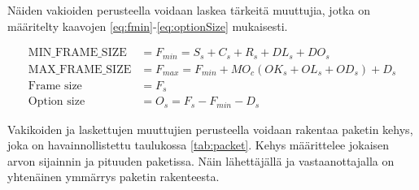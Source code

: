 \documentclass[a4paper,12pt]{article}
\begin{document}
    Näiden vakioiden perusteella voidaan laskea tärkeitä muuttujia, jotka on määritelty kaavojen \ref{eq:fmin}-\ref{eq:optionSize} mukaisesti.

    \begin{align}
        \text{MIN\_FRAME\_SIZE} &= F_{min} = S_s + C_s + R_s + DL_s + DO_s \label{eq:fmin} \\
        \text{MAX\_FRAME\_SIZE} &= F_{max} = F_{min} + MO_c(OK_s + OL_s + OD_s) + D_s \label{eq:fmax} \\
        \text{Frame size} &= F_s \\
        \text{Option size} &= O_s = F_s - F_{min} - D_s \label{eq:optionSize}
    \end{align}

    Vakikoiden ja laskettujen muuttujien perusteella voidaan rakentaa paketin kehys, joka on havainnollistettu taulukossa \ref{tab:packet}.
    Kehys määrittelee jokaisen arvon sijainnin ja pituuden paketissa. Näin lähettäjällä ja vastaanottajalla on yhtenäinen ymmärrys paketin rakenteesta.

    \begin{table}[h!]
        \centering
        \caption{Paketin rakenne}
        \label{tab:packet}
    \end{table}
\end{document}
